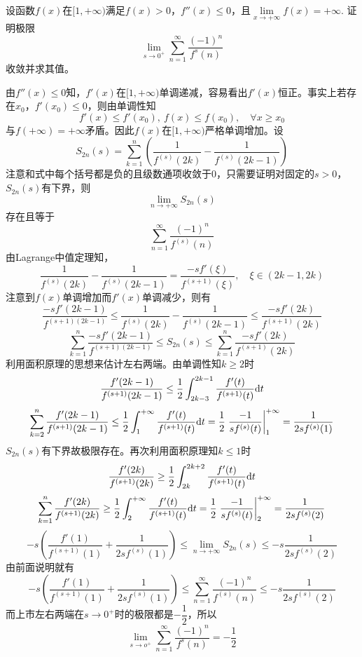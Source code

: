 \begin{proposition}
    
    设函数$f(x)$在$[1, + \infty)$满足$f(x) > 0$，$f''(x) \leq 0$，且$\lim\limits_{x \to +\infty}{f(x)} = +\infty$. 证明极限
    $$\lim\limits_{s \to 0^{+}}{\sum\limits_{n = 1}^{\infty}{\dfrac{(-1)^n}{f^{s}(n)}}}$$
    收敛并求其值。

\end{proposition}

\begin{proposition}

    由$f''(x) \leq 0$知，$f'(x)$在$[1, +\infty)$单调递减，容易看出$f'(x)$恒正。事实上若存在$x_0$，$f'(x_0) \leq 0$，则由单调性知
    $$f'(x) \leq f'(x_0), \ f(x) \leq f(x_0), \quad \forall x \geq x_0$$
    与$f(+\infty) = + \infty$矛盾。因此$f(x)$在$[1, +\infty)$严格单调增加。设
    $$S_{2n}(s) = \sum\limits_{k = 1}^{n}{\left(\dfrac{1}{f^{(s)}(2k)} - \dfrac{1}{f^{(s)}(2k -1)}\right)}$$
    注意和式中每个括号都是负的且级数通项收敛于$0$，只需要证明对固定的$s > 0$，$S_{2n}(s)$有下界，则
    $$\lim\limits_{n \to +\infty}{S_{2n}(s)}$$
    存在且等于
    $$\sum\limits_{n = 1}^{\infty}{\dfrac{(-1)^n}{f^{(s)}(n)}}$$
    由\textup{Lagrange}中值定理知，
    $$\dfrac{1}{f^{(s)}(2k)} - \dfrac{1}{f^{(s)}(2k -1)} = \dfrac{-sf'(\xi)}{f^{(s + 1)}(\xi)}, \quad \xi \in (2k - 1, 2k)$$
    注意到$f(x)$单调增加而$f'(x)$单调减少，则有
    $$\dfrac{-sf'(2k - 1)}{f^{(s + 1)(2k - 1)}} \leq \dfrac{1}{f^{(s)}(2k)} - \dfrac{1}{f^{(s)}(2k - 1)} \leq \dfrac{-sf'(2k)}{f^{(s + 1)}(2k)}$$
    $$\sum\limits_{k = 1}^{n}{\dfrac{-sf'(2k - 1)}{f^{(s + 1)(2k - 1)}}} \leq S_{2n}(s) \leq \sum\limits_{k = 1}^{n}{\dfrac{-sf'(2k)}{f^{(s + 1)}(2k)}}$$
    利用面积原理的思想来估计左右两端。由单调性知$k \geq 2$时
    $$\dfrac{f'(2k - 1)}{f^{(s + 1)}(2k - 1)} \leq \dfrac{1}{2} \int_{2k - 3}^{2k - 1}{\dfrac{f'(t)}{f^{(s + 1)}(t)}}\mathrm{d} t$$
    $$\sum\limits_{k = 2}^{n}{\dfrac{f'(2k - 1)}{f^{(s + 1)}(2k - 1)}} \leq \dfrac{1}{2} \int_{1}^{+\infty}{\dfrac{f'(t)}{f^{(s + 1)}(t)}}\mathrm{d} t = \dfrac{1}{2} \left.\dfrac{-1}{sf^{(s)}(t)}\right|_{1}^{+\infty} = \dfrac{1}{2sf^{(s)}(1)}$$
    $S_{2n}(s)$有下界故极限存在。再次利用面积原理知$k \leq 1$时
    $$\dfrac{f'(2k)}{f^{(s + 1)}(2k)} \geq \dfrac{1}{2} \int_{2k}^{2k + 2}{\dfrac{f'(t)}{f^{(s + 1)}(t)}}\mathrm{d} t$$
    $$\sum\limits_{k = 1}^{n}{\dfrac{f'(2k)}{f^{(s + 1)}(2k)}} \geq \dfrac{1}{2} \int_{2}^{+\infty}{\dfrac{f'(t)}{f^{(s + 1)}(t)}}\mathrm{d} t = \dfrac{1}{2} \left.\dfrac{-1}{sf^{(s)}(t)}\right|_{2}^{+\infty} = \dfrac{1}{2sf^{(s)}(2)}$$
    $$-s\left( \dfrac{f'(1)}{f^{(s + 1)}(1)} + \dfrac{1}{2sf^{(s)}(1)}\right) \leq \lim\limits_{n \to +\infty}{S_{2n}(s)} \leq -s\dfrac{1}{2sf^{(s)}(2)}$$
    由前面说明就有
    $$-s\left( \dfrac{f'(1)}{f^{(s + 1)}(1)} + \dfrac{1}{2sf^{(s)}(1)}\right) \leq \sum\limits_{n = 1}^{\infty}{\dfrac{(-1)^n}{f^{(s)}(n)}} \leq -s\dfrac{1}{2sf^{(s)}(2)}$$
    而上市左右两端在$s \to 0^{+}$时的极限都是$-\dfrac{1}{2}$，所以
    $$\lim\limits_{s \to o^{+}}{\sum\limits_{n = 1}^{\infty}{\dfrac{(-1)^n}{f^{s}(n)}}} = -\dfrac{1}{2}$$

\end{proposition}

